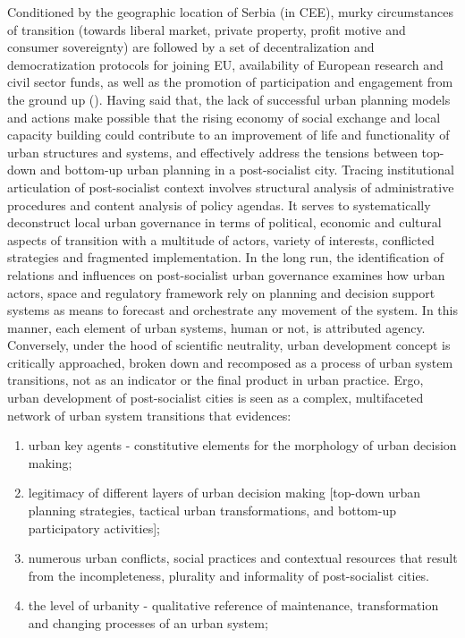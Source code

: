 \documentclass[11pt]{report}
\begin{document}
Conditioned by the geographic location of Serbia (in CEE), murky circumstances of transition (towards liberal market, private property, profit motive and consumer sovereignty) are followed by a set of decentralization and democratization protocols for joining EU, availability of European research and civil sector funds, as well as the promotion of participation and engagement from the ground up (\href{ref}{\citealt{ref}}). Having said that, the lack of successful urban planning models and actions make possible that the rising economy of social exchange and local capacity building could contribute to an improvement of life and functionality of urban structures and systems, and effectively address the tensions between top-down and bottom-up urban planning in a post-socialist city. Tracing institutional articulation of post-socialist context involves structural analysis of administrative procedures and content analysis of policy agendas. It serves to systematically deconstruct local urban governance in terms of political, economic and cultural aspects of transition with a multitude of actors, variety of interests, conflicted strategies and fragmented implementation. In the long run, the identification of relations and influences on post-socialist urban governance examines how urban actors, space and regulatory framework rely on planning and decision support systems as means to forecast and orchestrate any movement of the system. In this manner, each element of urban systems, human or not, is attributed agency.
\\
Conversely, under the hood of scientific neutrality, urban development concept is critically approached, broken down and recomposed as a process of urban system transitions, not as an indicator or the final product in urban practice.
Ergo, urban development of post-socialist cities is seen as a complex, multifaceted network of urban system transitions that evidences: 
\begin{enumerate}
\item urban key agents - constitutive elements for the morphology of urban decision making;
\item legitimacy of different layers of urban decision making [top-down urban planning strategies, tactical urban transformations, and bottom-up participatory activities];
\item numerous urban conflicts, social practices and contextual resources that result from the incompleteness, plurality and informality of post-socialist cities.
\item the level of urbanity - qualitative reference of maintenance, transformation and changing processes of an urban system;
\end{enumerate}  
\end{document}
